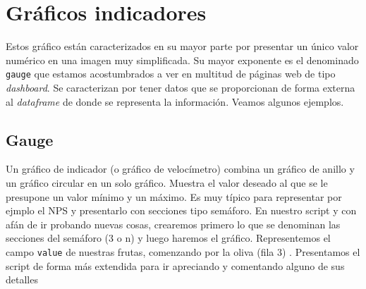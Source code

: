 \documentclass[
]{book}
\begin{document}
\hypertarget{gruxe1ficos-indicadores}{%
\section{Gráficos indicadores}\label{gruxe1ficos-indicadores}}

Estos gráfico están caracterizados en su mayor parte por presentar un único valor numérico en una imagen muy simplificada. Su mayor exponente es el denominado \texttt{gauge} que estamos acostumbrados a ver en multitud de páginas web de tipo \emph{dashboard}. Se caracterizan por tener datos que se proporcionan de forma externa al \emph{dataframe} de donde se representa la información. Veamos algunos ejemplos.

\hypertarget{gauge}{%
\subsection{Gauge}\label{gauge}}

Un gráfico de indicador (o gráfico de velocímetro) combina un gráfico de anillo y un gráfico circular en un solo gráfico. Muestra el valor deseado al que se le presupone un valor mínimo y un máximo. Es muy típico para representar por ejmplo el NPS y presentarlo con secciones tipo semáforo. En nuestro script y con afán de ir probando nuevas cosas, crearemos primero lo que se denominan las secciones del semáforo (3 o n) y luego haremos el gráfico. Representemos el campo \texttt{value} de nuestras frutas, comenzando por la oliva (fila 3) . Presentamos el script de forma más extendida para ir apreciando y comentando alguno de sus detalles
\end{document}
